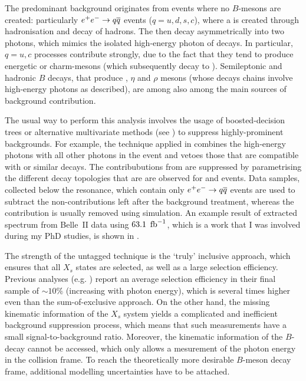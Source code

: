 The predominant background originates from events where no $B$-mesons are created: particularly $e^+e^-\rightarrow q\overline q$ events ($q={u,d,s,c}$), where a \piz is created through hadronisation and decay of hadrons.
The \piz then decay asymmetrically into two photons, which mimics the isolated high-energy photon of \BtoXsgamma decays.
In particular, $q={u,c}$ processes contribute strongly, due to the fact that they tend to produce energetic \piz or charm-mesons (which subsequently decay to \piz).
Semileptonic and hadronic $B$ decays, that produce \piz, $\eta$ and $\rho$ mesons (whose decays chains involve high-energy photons as described), are among also among the main sources of background contribution.

The usual way to perform this analysis involves the usage of boosted-decision trees or alternative multivariate methods (see ) to suppress highly-prominent backgrounds.
For example, the technique applied in \cite{CLEO:2001gsa,Belle:2009nth} combines the high-energy photons with all other photons in the event and vetoes those that are compatible with \piz or similar decays.
The contribubutions from \epem\ra\qqbar are suppressed by parametrising the different decay topologies that are are observed for \BB and \qqbar events.
Data samples, collected below the \FourS resonance, which contain only $e^+e^-\rightarrow q\overline q$ events are used to subtract the non-\BB contributions left after the background treatment, 
whereas the \BB contribution is usually removed using simulation.
An example result of extracted \BtoXsgamma spectrum from Belle~II data using $63.1~\mbox{\,fb}^{-1}$, which is a work that I was involved during my PhD studies, is shown in  \cite{Collaboration:2302}.

The strength of the untagged technique is the `truly' inclusive approach, which ensures that all $X_s$ states are selected, as well as a large selection efficiency.
Previous analyses (e.g. \cite{Belle:2009nth}) report an average selection efficiency in their final sample of $\sim 10\%$ (increasing with photon energy), which is several times higher even than the sum-of-exclusive approach.
On the other hand, the missing kinematic information of the $X_s$ system yields a complicated and inefficient background suppression process, which means that such measurements have a small signal-to-background ratio.
Moreover, the kinematic information of the $B$-decay cannot be accessed, which only allows a mesurement of the photon energy in the \epem collision frame.
To reach the theoretically more desirable $B$-meson decay frame, additional modelling uncertainties have to be attached.

